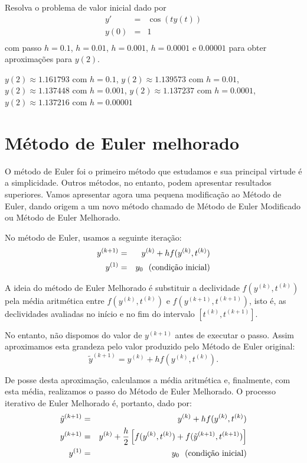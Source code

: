 \begin{Exercise}Resolva o problema de valor inicial dado por
\begin{eqnarray*}
y'&=& \cos(ty(t))\\
y(0)&=&1\\
\end{eqnarray*}
com passo $h=0.1$, $h=0.01$, $h=0.001$, $h=0.0001$ e $0.00001$ para obter aproximações para $y(2)$. 
\end{Exercise}
\begin{Answer}
$y(2)\approx 1.161793$ com $h=0.1$, 
$y(2)\approx 1.139573$ com $h=0.01$,
$y(2)\approx 1.137448$ com $h=0.001$,
$y(2)\approx 1.137237$ com $h=0.0001$,
$y(2)\approx 1.137216$ com $h=0.00001$ 
\end{Answer}


\section{Método de Euler melhorado}
O método de Euler foi o primeiro método que estudamos e sua principal virtude é a simplicidade. Outros métodos, no entanto, podem apresentar resultados superiores. Vamos apresentar agora uma pequena modificação ao Método de Euler, dando origem a um novo método chamado de Método de Euler Modificado ou Método de Euler Melhorado.

No método de Euler, usamos a seguinte iteração:
\begin{eqnarray*}
y^{(k+1)}&=&y^{(k)}+hf(y^{(k)},t^{(k)})\\
y^{(1)}&=&y_0~~ \hbox{(condição inicial)}
\end{eqnarray*}

A ideia do método de Euler Melhorado é substituir a declividade  $f(y^{(k)},t^{(k)})$ pela média aritmética entre $f(y^{(k)},t^{(k)})$ e $f(y^{(k+1)},t^{(k+1)})$, isto é, as declividades avaliadas no início e no fim do intervalo $[t^{(k)},t^{(k+1)}]$.

No entanto, não dispomos do valor de $y^{(k+1)}$ antes de executar o passo. Assim aproximamos esta grandeza pelo valor produzido pelo Método de Euler original:
$$\tilde{y}^{(k+1)}=y^{(k)}+hf(y^{(k)},t^{(k)}).$$

De posse desta aproximação, calculamos a média aritmética e, finalmente, com esta média, realizamos o passo do Método de Euler Melhorado. O processo iterativo de Euler Melhorado é, portanto, dado por:
\begin{eqnarray*}
\tilde{y}^{(k+1)}&=&y^{(k)}+hf(y^{(k)},t^{(k)})\\
y^{(k+1)}&=&y^{(k)}+\frac{h}{2}\left[f(y^{(k)},t^{(k)})+f(\tilde{y}^{(k+1)},t^{(k+1)})\right]\\
y^{(1)}&=&y_0~~ \hbox{(condição inicial)}
\end{eqnarray*}


